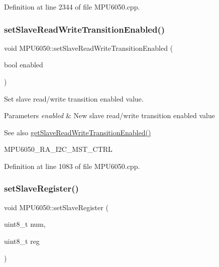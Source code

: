 Definition at line 2344 of file M\+P\+U6050.\+cpp.

\mbox{\label{classMPU6050_a3413efbf2f4e8a27aa8768d9bc34d663}} 
\subsubsection{\texorpdfstring{setSlaveReadWriteTransitionEnabled()}{setSlaveReadWriteTransitionEnabled()}}
{\footnotesize\ttfamily void M\+P\+U6050\+::set\+Slave\+Read\+Write\+Transition\+Enabled (\begin{DoxyParamCaption}\item[{bool}]{enabled }\end{DoxyParamCaption})}



Set slave read/write transition enabled value. 


\begin{DoxyParams}{Parameters}
{\em enabled} & New slave read/write transition enabled value \\
\hline
\end{DoxyParams}
\begin{DoxySeeAlso}{See also}
\mbox{\hyperlink{classMPU6050_a6b3c3aab80fcaa384303f9df2a59d7eb}{get\+Slave\+Read\+Write\+Transition\+Enabled()}} 

M\+P\+U6050\+\_\+\+R\+A\+\_\+\+I2\+C\+\_\+\+M\+S\+T\+\_\+\+C\+T\+RL 
\end{DoxySeeAlso}


Definition at line 1083 of file M\+P\+U6050.\+cpp.

\mbox{\label{classMPU6050_a62851e982059a2462d52c210ad764a1c}} 
\subsubsection{\texorpdfstring{setSlaveRegister()}{setSlaveRegister()}}
{\footnotesize\ttfamily void M\+P\+U6050\+::set\+Slave\+Register (\begin{DoxyParamCaption}\item[{uint8\+\_\+t}]{num,  }\item[{uint8\+\_\+t}]{reg }\end{DoxyParamCaption})}



